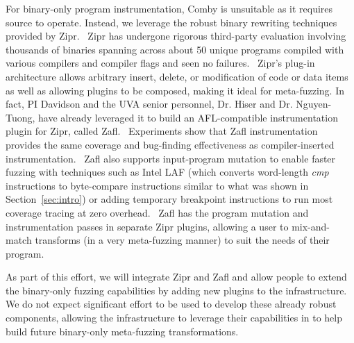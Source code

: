 

For binary-only program instrumentation, Comby is unsuitable as it requires source to operate.
Instead, we leverage the robust binary rewriting techniques provided by Zipr.~\cite{hawkins2017zipr, hiser2017zipr++,zipr}
Zipr has undergone rigorous third-party evaluation involving thousands of binaries spanning across about 50 unique programs
compiled with various compilers and compiler flags and seen no failures.~\cite{schulte2022broad}
Zipr's plug-in architecture allows arbitrary insert, delete, or modification of 
code or data items as well as allowing plugins to be composed, making it ideal for meta-fuzzing.  
In fact, PI Davidson and the UVA senior personnel,
Dr. Hiser and Dr. Nguyen-Tuong, have already leveraged it to build an 
AFL-compatible instrumentation plugin for Zipr, called
Zafl.~\cite{zafl}  
Experiments show that Zafl instrumentation provides the same
coverage and bug-finding effectiveness as compiler-inserted instrumentation.~\cite{nagy2021breaking}
Zafl also supports input-program mutation to enable faster fuzzing with techniques such as Intel LAF 
(which converts word-length \textit{cmp} instructions to byte-compare instructions similar to what was 
shown in Section~\ref{sec:intro}) or adding temporary breakpoint instructions to
run most coverage tracing at zero overhead.~\cite{intel2016circumventing,nagy2021same}
Zafl has the program mutation and instrumentation passes in separate Zipr plugins, allowing a user to mix-and-match
transforms (in a very meta-fuzzing manner) to suit the needs of their program.

As part of this effort, we will integrate Zipr and Zafl and allow people to extend the binary-only fuzzing
capabilities by adding new plugins to the infrastructure.  We do not expect significant effort to be used to 
develop these already robust components, allowing the infrastructure to leverage their capabilities in to help
build future binary-only meta-fuzzing transformations.
